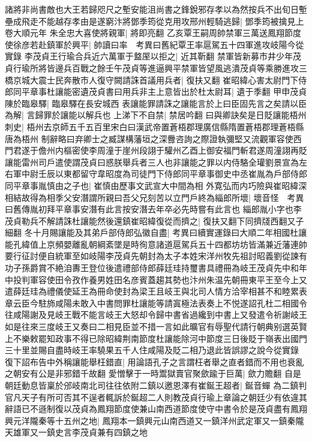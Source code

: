 諸將非尚書敵也大王若歸咫尺之塹安能沮尚書之鋒銳邪存孝以為然按兵不出旬日塹壘成飛走不能越存孝由是遂窮汴將鄧季筠從克用攻邢州輕騎逃歸|{
	鄧季筠被擒見上卷大順元年}
朱全忠大喜使將親軍|{
	將即亮翻}
乙亥覃王嗣周帥禁軍三萬送鳳翔節度使徐彦若赴鎮軍於興平|{
	帥讀曰率　考異曰舊紀覃王率扈駕五十四軍進攻岐陽今從實錄}
李茂貞王行瑜合兵近六萬軍于盩厔以拒之|{
	近其靳翻}
禁軍皆新募市井少年茂貞行瑜所將皆邊兵百戰之餘壬午茂貞等進逼興平禁軍皆望風逃潰茂貞等乘勝進攻三橋京城大震士民奔散市人復守闕請誅首議用兵者|{
	復扶又翻}
崔昭緯心害太尉門下侍郎同平章事杜讓能密遺茂貞書曰用兵非主上意皆出於杜太尉耳|{
	遺于季翻}
甲申茂貞陳於臨皋驛|{
	臨皋驛在長安城西}
表讓能罪請誅之讓能言於上曰臣固先言之矣請以臣為解|{
	言歸罪於讓能以解兵也}
上涕下不自禁|{
	禁居吟翻}
曰與卿訣矣是日貶讓能梧州刺史|{
	梧州去京師五千五百里宋白曰漢武帝置蒼梧郡理廣信縣隋置蒼梧郡理蒼梧縣唐為梧州}
制辭略曰弃卿士之臧謀構藩垣之深釁咨詢之際證執彌堅又流觀軍容使西門君遂于儋州内樞密使李周潼于崖州段詡于驩州乙酉上御安福門斬君遂周潼詡再貶讓能雷州司戶遣使謂茂貞曰惑朕舉兵者三人也非讓能之罪以内侍駱全瓘劉景宣為左右軍中尉壬辰以東都留守韋昭度為司徒門下侍郎同平章事御史中丞崔胤為戶部侍郎同平章事胤慎由之子也|{
	崔慎由歷事文武宣大中間為相}
外寛弘而内巧險與崔昭緯深相結故得為相季父安潛謂所親曰吾父兄刻苦以立門戶終為緇郎所壞|{
	壞音怪　考異曰舊傳胤初拜平章事安潛有此言按安潛去年卒必先時嘗有此言也}
緇郎胤小字也李茂貞勒兵不解請誅杜讓能然後還鎮崔昭緯復從而擠之|{
	復扶又翻下同擠牋西翻又子細翻}
冬十月賜讓能及其弟戶部侍郎弘徽自盡|{
	考異曰續實運錄曰大順二年相國杜讓能孔緯值上京頻嬰離亂朝綱紊墜是時徇意諸道扈駕兵五十四都坊坊皆滿兼近藩連帥要行征討便自統軍至如岐陽李茂貞先朝封為太子本姓宋洋州牧先祖討昭義劉從諫有功子孫爵賞不絶洎夀王登位後遣禮部侍郎薛廷珪持璽書具禮冊為岐王茂貞先中和年中投判軍容使田令孜作養男姓田名彦賓蓋趨其勢也汴州朱温先朝冊東平王至今上又遣薛廷珪為禮儀使延王為冊命使封為梁王且岐王與北司人情方洽宰相甚不和睦累表章云臣今駐斾咸陽未敢入中書問罪杜讓能等請寘極法表奏上不悦遂詔孔杜二相國令往咸陽謝及見岐王戰不能言岐王大怒却令歸中書省過纔到中書上又發遣令祈謝岐王如是往來三度岐王又奏曰二相見臣並不措一言如此曠官有辱聖代請行朝典别選英賢上不樂敕罷知政事不得已除昭緯荆南節度杜讓能除河中節度三日後貶于嶺表出國門三十里並賜自盡時岐王率驍果五千人住咸陽及貶二相乃退此皆誤謬之說今從實錄}
復下詔布告中外稱讓能舉枉錯直|{
	用論語孔子之言謂枉者舉之直者錯而不用也衰亂之朝安有公是非邪錯千故翻}
愛憎擊于一時鬻獄賣官聚歛踰于巨萬|{
	歛力贍翻}
自是朝廷動息皆稟於邠岐南北司往往依附二鎮以邀恩澤有崔鋋王超者|{
	鋋音蟬}
為二鎮判官凡天子有所可否其不逞者輒訴於鋋超二人則教茂貞行瑜上章論之朝廷少有依違其辭語已不遜制復以茂貞為鳳翔節度使兼山南西道節度使守中書令於是茂貞盡有鳳翔興元洋隴秦等十五州之地|{
	鳳翔本一鎮興元山南西道又一鎮洋州武定軍又一鎮秦隴天雄軍又一鎮史言李茂貞兼有四鎮之地}
